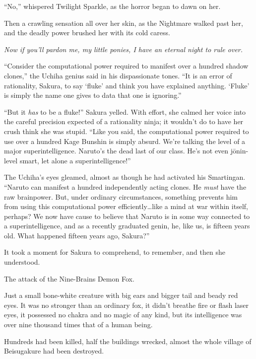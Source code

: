 “No,” whispered Twilight Sparkle, as the horror began to dawn on her.

Then a crawling sensation all over her skin, as the Nightmare walked past her, and the deadly power brushed her with its cold caress.

\emph{Now if you’ll pardon me, my little ponies, I have an eternal night to rule over.}

\clearpage
{}

“Consider the computational power required to manifest over a hundred shadow clones,” the Uchiha genius said in his dispassionate tones. “It is an error of rationality, Sakura, to say ‘fluke’ and think you have explained anything. ‘Fluke’ is simply the name one gives to data that one is ignoring.”

“But it \emph{has} to be a fluke!” Sakura yelled. With effort, she calmed her voice into the careful precision expected of a rationality ninja; it wouldn’t do to have her crush think she was stupid. “Like you said, the computational power required to use over a hundred Kage Bunshin is simply absurd. We’re talking the level of a major superintelligence. Naruto’s the dead last of our class. He’s not even jōnin-level smart, let alone a superintelligence!”

The Uchiha’s eyes gleamed, almost as though he had activated his Smartingan. “Naruto can manifest a hundred independently acting clones. He \emph{must} have the raw brainpower. But, under ordinary circumstances, something prevents him from using this computational power efficiently…like a mind at war within itself, perhaps? We now have cause to believe that Naruto is in some way connected to a superintelligence, and as a recently graduated genin, he, like us, is fifteen years old. What happened fifteen years ago, Sakura?”

It took a moment for Sakura to comprehend, to remember, and then she understood.

The attack of the Nine-Brains Demon Fox.

Just a small bone-white creature with big ears and bigger tail and beady red eyes. It was no stronger than an ordinary fox, it didn’t breathe fire or flash laser eyes, it possessed no chakra and no magic of any kind, but its intelligence was over nine thousand times that of a human being.

Hundreds had been killed, half the buildings wrecked, almost the whole village of Beisugakure had been destroyed.

